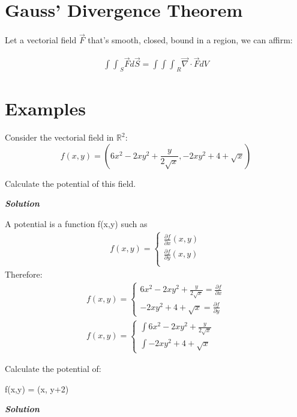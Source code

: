 \documentclass[11pt,fleqn]{book} %
\begin{document}
\section{Gauss' Divergence Theorem}

Let a vectorial field $\vec{F}$ that's smooth, closed, bound in a region, we can affirm:

\begin{gather}
    {\int \int}_S \vec{F} d\vec{S} = {\int \int \int}_R \vec{\nabla} \cdot \vec{F} dV 
\end{gather}

\section{Examples}

\begin{example}
    Consider the vectorial field in $\mathbb{R}^2$:
    $$f(x,y) = (6x^2 - 2xy^2 + \frac{y}{2\sqrt{x}}, -2xy^2 +4+ \sqrt{x})$$

    Calculate the potential of this field.

    \textit{\textbf{Solution}}

    A potential is a function f(x,y) such as 
    \begin{gather}
        f(x,y) =
        \begin{cases}
            \frac{\partial f}{\partial x}(x,y)\\
            \frac{\partial f}{\partial y}(x,y)\\
        \end{cases}
    \end{gather}
    Therefore:
    \begin{gather}
        f(x,y) =
        \begin{cases}
            6x^2 - 2xy^2 + \frac{y}{2\sqrt{x}} = \frac{\partial f}{\partial x}\\
            -2xy^2 + 4 + \sqrt{x} = \frac{\partial f}{\partial y}
        \end{cases}\\ f(x,y) =
        \begin{cases}
            \int 6x^2 - 2xy^2 + \frac{y}{2\sqrt{x}}\\
            \int -2xy^2 + 4 + \sqrt{x}
        \end{cases}
    \end{gather}
\end{example}

\begin{example}
    Calculate the potential of:

    f(x,y) = (x, y+2)

    \textit{\textbf{Solution}}

    
\end{example}
\end{document}
